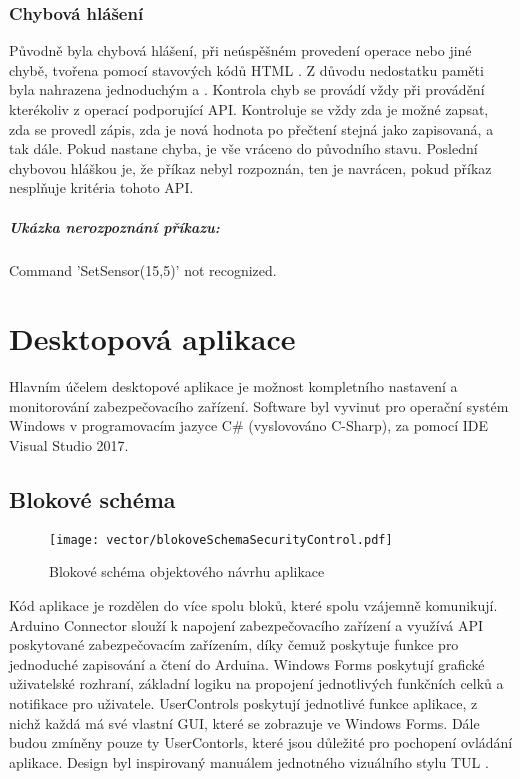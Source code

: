 \documentclass[FM,MP]{tulthesis}  %
\begin{document}
\subsection{Chybová hlášení}
Původně byla chybová hlášení, při neúspěšném provedení operace nebo jiné chybě, tvořena pomocí stavových kódů HTML \cite{HTML1.1}. Z důvodu nedostatku paměti byla nahrazena jednoduchým  a . Kontrola chyb se provádí vždy při provádění kterékoliv z operací podporující API. Kontroluje se vždy zda je možné zapsat, zda se provedl zápis, zda je nová hodnota po přečtení stejná jako zapisovaná, a tak dále. Pokud nastane chyba, je vše vráceno do původního stavu. Poslední chybovou hláškou je, že příkaz nebyl rozpoznán, ten je navrácen, pokud příkaz nesplňuje kritéria tohoto API.

\paragraph{Ukázka nerozpoznání příkazu:}
\begin{center}
Command 'SetSensor(15,5)' not recognized.
\end{center} 


\chapter{Desktopová aplikace}
Hlavním účelem desktopové aplikace je možnost kompletního nastavení a monitorování zabezpečovacího zařízení. Software byl vyvinut pro operační systém Windows v programovacím jazyce C\# (vyslovováno C-Sharp), za pomocí IDE Visual Studio 2017.

\section{Blokové schéma}

\begin{figure}[H]
\begin{center}
\texttt{[image: vector/blokoveSchemaSecurityControl.pdf]}
\caption{Blokové schéma objektového návrhu aplikace}
\label{image}
\end{center}
\end{figure}

Kód aplikace je rozdělen do více spolu bloků, které spolu vzájemně komunikují. Arduino Connector slouží k napojení zabezpečovacího zařízení a využívá API poskytované zabezpečovacím zařízením, díky čemuž poskytuje funkce pro jednoduché zapisování a čtení do Arduina. Windows Forms poskytují grafické uživatelské rozhraní, základní logiku na propojení jednotlivých funkčních celků a notifikace pro uživatele. UserControls poskytují jednotlivé funkce aplikace, z nichž každá má své vlastní GUI, které se zobrazuje ve Windows Forms. Dále budou zmíněny pouze ty UserContorls, které jsou důležité pro pochopení ovládání aplikace. Design byl inspirovaný manuálem jednotného vizuálního stylu TUL \cite{TULVisual}.
\end{document}
